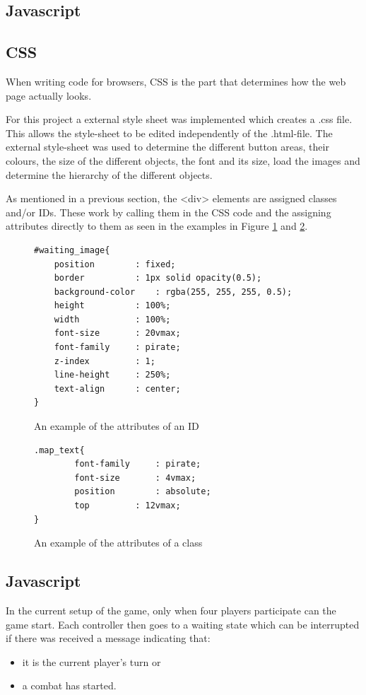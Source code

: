 \subsection{Javascript}\label{controllerJavascript}


\subsection{CSS}\label{controllerCSS}
When writing code for browsers, CSS is the part that determines how the web page actually looks.

For this project a external style sheet was implemented which creates a .css file. This allows the style-sheet to be edited independently of the .html-file. The external style-sheet was used to determine the different button areas, their colours, the size of the different objects, the font and its size, load the images and determine the hierarchy of the different objects. 

As mentioned in a previous section, the <div> elements are assigned classes and/or IDs. These work by calling them in the CSS code and the assigning attributes directly to them as seen in the examples in Figure \ref{IDex} and \ref{Classex}. 
\begin{figure}
\begin{lstlisting}
#waiting_image{
	position		: fixed;
	border			: 1px solid opacity(0.5);
	background-color	: rgba(255, 255, 255, 0.5);
	height			: 100%;
	width			: 100%;
	font-size		: 20vmax;
	font-family		: pirate;
	z-index			: 1;
	line-height		: 250%;
	text-align		: center;
}
\end{lstlisting} 
\caption{An example of the attributes of an ID \label{IDex}}
\end{figure}

\begin{figure}
\begin{lstlisting}
.map_text{
		font-family		: pirate;
		font-size		: 4vmax;
		position		: absolute;
		top			: 12vmax;
}
\end{lstlisting} 
\caption{An example of the attributes of a class \label{Classex}}
\end{figure}

\subsection{Javascript}
In the current setup of the game, only when four players participate can the game start. Each controller then goes to a waiting state which can be interrupted if there was received a message indicating that:
\begin{itemize}
\item it is the current player's turn or
\item a combat has started.
\end{itemize}

